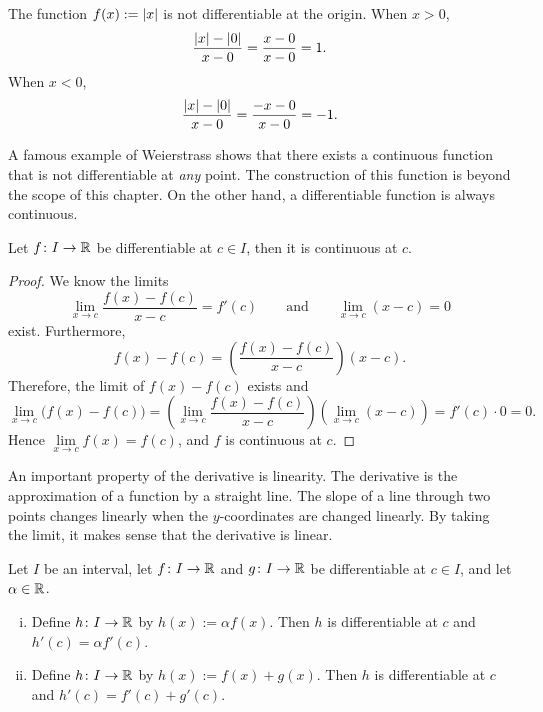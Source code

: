 \begin{example}
The function $f(x) := \left\lvert {x} \right\rvert$ is not differentiable
at the origin.  When $x > 0$,
\begin{equation*}
\frac{\left\lvert {x} \right\rvert-\left\lvert {0} \right\rvert}{x-0} =
\frac{x-0}{x-0} = 1 .
\end{equation*}
When $x < 0$,
\begin{equation*}
\frac{\left\lvert {x} \right\rvert-\left\lvert {0} \right\rvert}{x-0} =
\frac{-x-0}{x-0} = -1 .
\end{equation*}
\end{example}

A famous example of Weierstrass shows that there exists a continuous
function that is not differentiable at \emph{any} point.  The construction
of this function is beyond the scope of this chapter.  On the other hand,
a differentiable function is always continuous.

\begin{prop}
Let $f \colon I \to {\mathbb{R}}$ be differentiable at $c \in I$,
then it is continuous at $c$.
\end{prop}

\begin{proof}
We know the limits
\begin{equation*}
\lim_{x\to c}\frac{f(x)-f(c)}{x-c} = f'(c)
\qquad
\text{and}
\qquad
\lim_{x\to c}(x-c) = 0
\end{equation*}
exist.  Furthermore,
\begin{equation*}
f(x)-f(c) = 
\left( \frac{f(x)-f(c)}{x-c} \right) (x-c) .
\end{equation*}
Therefore, the limit of $f(x)-f(c)$ exists and
\begin{equation*}
\lim_{x\to c} \bigl( f(x)-f(c) \bigr) =
\left(\lim_{x\to c} \frac{f(x)-f(c)}{x-c} \right)
\left(\lim_{x\to c} (x-c) \right) =
f'(c) \cdot 0  = 0.
\end{equation*}
Hence $\lim\limits_{x\to c} f(x) = f(c)$, and $f$ is continuous at $c$.
\end{proof}

An important property of the derivative is linearity.  The
derivative is the approximation of a function by a straight line.
The slope of a line through two points changes linearly when the
$y$-coordinates are changed linearly.  By taking the limit,
it makes sense that the derivative is linear.

\begin{prop}[Linearity]
Let $I$ be an interval, let
$f \colon I \to {\mathbb{R}}$ and $g \colon I \to {\mathbb{R}}$ be differentiable at $c \in I$,
and let $\alpha \in {\mathbb{R}}$.
\begin{enumerate}[(i)]
\item
Define $h \colon I \to {\mathbb{R}}$ by $h(x) := \alpha f(x)$.  Then
$h$ is differentiable at $c$ and
$h'(c) = \alpha f'(c)$.
\item
Define $h \colon I \to {\mathbb{R}}$ by $h(x) :=  f(x) + g(x)$.  Then
$h$ is differentiable at $c$ and
$h'(c) =  f'(c) + g'(c)$.
\end{enumerate}
\end{prop}

